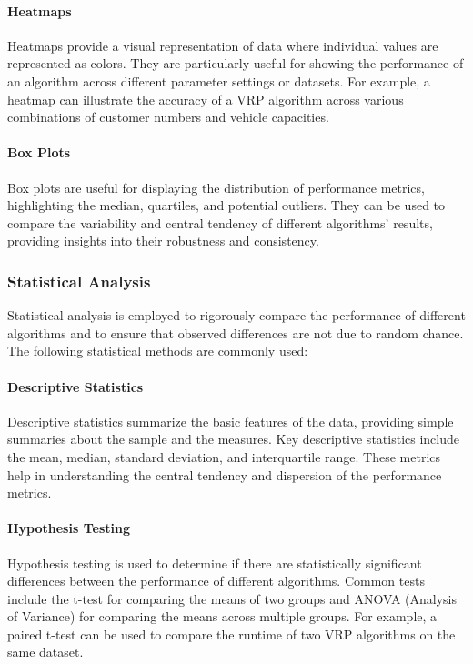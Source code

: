 \documentclass[
]{article}
\begin{document}
\paragraph{Heatmaps}

Heatmaps provide a visual representation of data where individual values are represented as colors. They are particularly useful for showing the performance of an algorithm across different parameter settings or datasets. For example, a heatmap can illustrate the accuracy of a VRP algorithm across various combinations of customer numbers and vehicle capacities.

\paragraph{Box Plots}

Box plots are useful for displaying the distribution of performance metrics, highlighting the median, quartiles, and potential outliers. They can be used to compare the variability and central tendency of different algorithms' results, providing insights into their robustness and consistency.

\subsubsection{Statistical Analysis}

Statistical analysis is employed to rigorously compare the performance of different algorithms and to ensure that observed differences are not due to random chance. The following statistical methods are commonly used:

\paragraph{Descriptive Statistics}

Descriptive statistics summarize the basic features of the data, providing simple summaries about the sample and the measures. Key descriptive statistics include the mean, median, standard deviation, and interquartile range. These metrics help in understanding the central tendency and dispersion of the performance metrics.

\paragraph{Hypothesis Testing}

Hypothesis testing is used to determine if there are statistically significant differences between the performance of different algorithms. Common tests include the t-test for comparing the means of two groups and ANOVA (Analysis of Variance) for comparing the means across multiple groups. For example, a paired t-test can be used to compare the runtime of two VRP algorithms on the same dataset.
\end{document}
